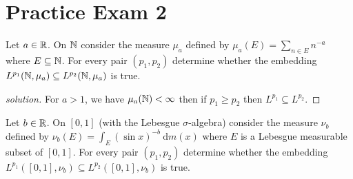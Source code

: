 

\section{Practice Exam 2}

\begin{problem}
  Let $a \in \mathbb R$. On $\mathbb N$ consider the measure $\mu_a$ 
  defined by $\mu_a(E) = \sum_{n\in E}n^{-a}$ where $E \subseteq \mathbb N$.
  For every pair $(p_1, p_2)$ determine whether the embedding 
  $L^{p_1}(\mathbb N, \mu_a) \subseteq L^{p_2}(\mathbb N, \mu_a)$ is true.
\end{problem}

\begin{proof}[solution]
  For $a > 1$, we have $\mu_a(\mathbb N) < \infty$ then if $p_1 \ge p_2$ then $L^{p_1} \subseteq L^{p_2}$.

\end{proof}

\begin{problem}
  Let $b \in \mathbb R$. On $[0, 1]$ (with the Lebesgue $\sigma$-algebra) 
  consider the measure $\nu_b$ defined by $\nu_b(E) = \int_E (\sin x)^{-b} \ \mathrm{d}m(x)$
  where $E$ is a Lebesgue measurable subset of $[0, 1]$. For every pair $(p_1, p_2)$ 
  determine whether the embedding $L^{p_1}([0, 1], \nu_b) \subseteq L^{p_2}([0, 1], \nu_b)$ is true.
\end{problem}


